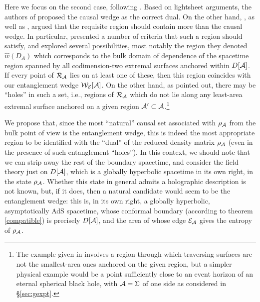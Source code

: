 \documentclass[12pt]{article}
\def\regA{{\cal A}}
\def\rhoA{{\rho_{\regA}}}
\def\domdA{D[\regA]}
\def\extr{{\cal E}_\regA}
\def\homsurfA{{\cal R}_{\regA}}
\def\EWA{{\cal W}_{\cal E}[\regA]}
\begin{document}
Here we focus on the second case, following \cite{Bousso:2012sj,Czech:2012bh}. Based on lightsheet arguments, the authors of \cite{Bousso:2012sj} proposed the causal wedge as the correct dual.  On the other hand, \cite{Czech:2012bh}, as well as \cite{Hubeny:2012wa, Wall:2012uf}, argued that the requisite region should contain more than the causal wedge.  In particular, \cite{Czech:2012bh} presented a number of criteria that such a region should satisfy, and explored several possibilities, most notably the region they denoted ${\hat w}(D_A)$ which corresponds to the bulk domain of dependence of the spacetime region spanned by all codimension-two extremal surfaces anchored within $\domdA$.  If every point of $\homsurfA$ lies on at least one of these, then this region coincides with our entanglement wedge $\EWA$.  On the other hand, as \cite{Czech:2012bh} pointed out, there may be ``holes'' in such a set, i.e., regions of $\homsurfA$ which do not lie along any least-area extremal surface anchored on a given region $\regA' \subset \regA$.\footnote{ 
The example given in \cite{Czech:2012bh} involves a region through which traversing surfaces are not the smallest-area ones anchored on the given region, 
but a simpler physical example would be a point sufficiently close to an event horizon of an eternal spherical black hole, with $\regA = \Sigma$ of one side as considered in \S\ref{sec:gexpt}.}

We propose that, since the most ``natural'' causal set associated with $\rhoA$ from the bulk point of view is the entanglement wedge, this is indeed the most appropriate region to be identified with the ``dual'' of the reduced density matrix $\rhoA$ (even in the presence of such entanglement ``holes''). In this context, we should note that we can strip away the rest of the boundary spacetime, and consider the field theory just on $D[\regA]$, which is a globally hyperbolic spacetime in its own right, in the state $\rho_\regA$. Whether this state in general admits a holographic description is not known, but, if it does, then a natural candidate would seem to be the entanglement wedge: this is, in its own right, a globally hyperbolic, asymptotically AdS spacetime, whose conformal boundary (according to theorem \ref{compatible}) is precisely $D[\regA]$, and the area of whose edge $\extr$ gives the entropy of $\rho_\regA$.
\end{document}

